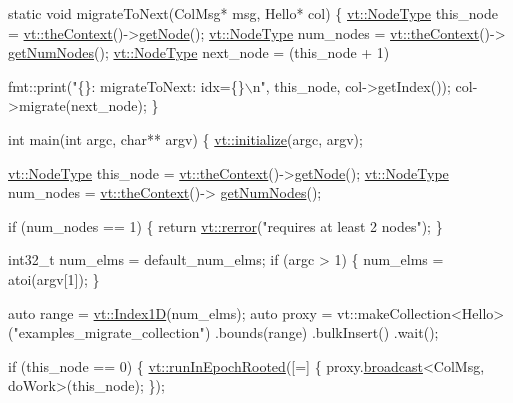\begin{DoxyCodeInclude}
\textcolor{keyword}{static} \textcolor{keywordtype}{void} migrateToNext(ColMsg* msg, Hello* col) \{
  \hyperlink{namespacevt_a866da9d0efc19c0a1ce79e9e492f47e2}{vt::NodeType} this\_node = \hyperlink{namespacevt_a26551fe0e6e6a1371111df5b12c7e92c}{vt::theContext}()->\hyperlink{structvt_1_1ctx_1_1_context_a0d52c263ce8516546a67443d9a86fa5f}{getNode}();
  \hyperlink{namespacevt_a866da9d0efc19c0a1ce79e9e492f47e2}{vt::NodeType} num\_nodes = \hyperlink{namespacevt_a26551fe0e6e6a1371111df5b12c7e92c}{vt::theContext}()->
      \hyperlink{structvt_1_1ctx_1_1_context_a7f41071aadf6d5fa9e1b6c703c5ff19d}{getNumNodes}();
  \hyperlink{namespacevt_a866da9d0efc19c0a1ce79e9e492f47e2}{vt::NodeType} next\_node = (this\_node + 1) %

  fmt::print(\textcolor{stringliteral}{"\{\}: migrateToNext: idx=\{\}\(\backslash\)n"}, this\_node, col->getIndex());
  col->migrate(next\_node);
\}

\textcolor{keywordtype}{int} main(\textcolor{keywordtype}{int} argc, \textcolor{keywordtype}{char}** argv) \{
  \hyperlink{namespacevt_a580ef23e9a224fc0907da1a6db308b5b}{vt::initialize}(argc, argv);

  \hyperlink{namespacevt_a866da9d0efc19c0a1ce79e9e492f47e2}{vt::NodeType} this\_node = \hyperlink{namespacevt_a26551fe0e6e6a1371111df5b12c7e92c}{vt::theContext}()->\hyperlink{structvt_1_1ctx_1_1_context_a0d52c263ce8516546a67443d9a86fa5f}{getNode}();
  \hyperlink{namespacevt_a866da9d0efc19c0a1ce79e9e492f47e2}{vt::NodeType} num\_nodes = \hyperlink{namespacevt_a26551fe0e6e6a1371111df5b12c7e92c}{vt::theContext}()->
      \hyperlink{structvt_1_1ctx_1_1_context_a7f41071aadf6d5fa9e1b6c703c5ff19d}{getNumNodes}();

  \textcolor{keywordflow}{if} (num\_nodes == 1) \{
    \textcolor{keywordflow}{return} \hyperlink{namespacevt_aff96ace008dc847d4c0f44cfa5dfb3a0}{vt::rerror}(\textcolor{stringliteral}{"requires at least 2 nodes"});
  \}

  int32\_t num\_elms = default\_num\_elms;
  \textcolor{keywordflow}{if} (argc > 1) \{
    num\_elms = atoi(argv[1]);
  \}

  \textcolor{keyword}{auto} range = \hyperlink{namespacevt_a5540efc78234273e1796fb003fe4d234}{vt::Index1D}(num\_elms);
  \textcolor{keyword}{auto} proxy = vt::makeCollection<Hello>(\textcolor{stringliteral}{"examples\_migrate\_collection"})
    .bounds(range)
    .bulkInsert()
    .wait();

  \textcolor{keywordflow}{if} (this\_node == 0) \{
    \hyperlink{namespacevt_a9f5cbbc484d7f14f2ad0ee46d62dfb6e}{vt::runInEpochRooted}([=] \{ proxy.\hyperlink{structvt_1_1objgroup_1_1proxy_1_1_proxy_a0b716ca776b1f06e0d7d45afbe9e5274}{broadcast}<ColMsg, doWork>(this\_node); \});


\end{DoxyCodeInclude}
